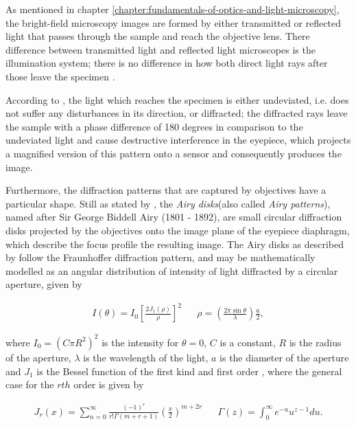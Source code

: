 As mentioned in chapter \ref{chapter:fundamentals-of-optics-and-light-microscopy}, the bright-field microscopy images are formed by either transmitted or reflected light that passes through the sample and reach the objective lens. There difference between transmitted light and reflected light microscopes is the illumination system; there is no difference in how both direct light rays after those leave the specimen \cite{leng2009materials}.

According to , the light which reaches the specimen is either undeviated, i.e. does not suffer any disturbances in its direction, or diffracted; the diffracted rays leave the sample with a phase difference of 180 degrees in comparison to the undeviated light and cause destructive interference in the eyepiece, which projects a magnified version of this pattern onto a sensor and consequently produces the image.

Furthermore, the diffraction patterns that are captured by objectives have a particular shape. Still as stated by , the \emph{Airy disks}(also called \emph{Airy patterns}), named after Sir George Biddell Airy (1801 - 1892), are small circular diffraction disks projected by the objectives onto the image plane of the eyepiece diaphragm, which describe the focus profile the resulting image. The Airy disks as described by  follow the Fraunhoffer diffraction pattern, and may be mathematically modelled as an angular distribution of intensity of light diffracted by a circular aperture, given by

\begin{align}
\label{eqn:airy_function}
I(\theta) = I_{0} 
            \left[ 
            \frac{2 J_{1} (\rho)}{\rho}
            \right]^{2}
&&
\rho = \left( 
        \frac{2 \pi \sin{\theta}}{\lambda}
        \right) \frac{a}{2},
\end{align}

\noindent where $I_{0} = (C \pi R^{2})^{2}$ is the intensity for $\theta = 0$, $C$ is a constant, $R$ is the radius of the aperture, $\lambda$ is the wavelength of the light, $a$ is the diameter of the aperture and $J_{1}$ is the Bessel function of the first kind and first order \cite{mathews1970mathematical}, where the general case for the $rth$ order is given by

\begin{align}
\label{eqn:1st_bessel}
J_{r}(x) = \sum_{n = 0}^{\infty}
            \frac{(-1)^{r}}
                 {r! \Gamma(m + r + 1)}
            \left(
                \frac{x}{2}
            \right)^{m + 2r}
&&
\Gamma(z) = \int_{0}^{\infty} e^{-u} u^{z-1}du.
\end{align}

